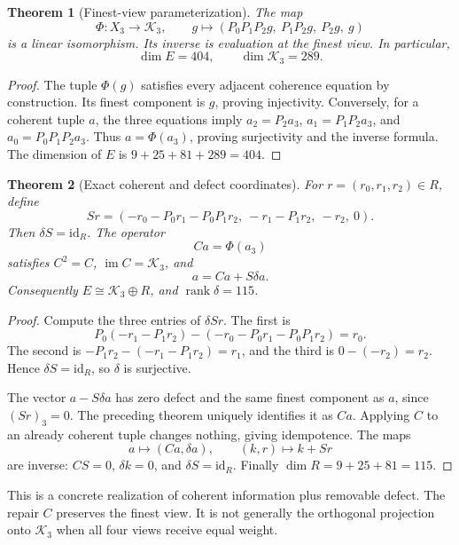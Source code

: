 \documentclass[11pt]{article}
\newtheorem{theorem}{Theorem}[section]
\theoremstyle{definition}
\theoremstyle{remark}
\newcommand{\K}{\mathcal K}
\newcommand{\id}{\mathrm{id}}
\newcommand{\im}{\operatorname{im}}
\begin{document}
\begin{theorem}[Finest-view parameterization]
The map
\[
 \Phi:X_3\longrightarrow\K_3,\qquad
 g\longmapsto(P_0P_1P_2g,\ P_1P_2g,\ P_2g,\ g)
\]
is a linear isomorphism. Its inverse is evaluation at the finest view. In particular,
\[
 \dim E=404,\qquad \dim\K_3=289.
\]
\end{theorem}
\begin{proof}
The tuple $\Phi(g)$ satisfies every adjacent coherence equation by construction. Its finest component is $g$, proving injectivity. Conversely, for a coherent tuple $a$, the three equations imply $a_2=P_2a_3$, $a_1=P_1P_2a_3$, and $a_0=P_0P_1P_2a_3$. Thus $a=\Phi(a_3)$, proving surjectivity and the inverse formula. The dimension of $E$ is $9+25+81+289=404$.
\end{proof}

\begin{theorem}[Exact coherent and defect coordinates]
For $r=(r_0,r_1,r_2)\in R$, define
\[
 Sr=(-r_0-P_0r_1-P_0P_1r_2,\ -r_1-P_1r_2,\ -r_2,\ 0).
\]
Then $\delta S=\id_R$. The operator
\[
 Ca=\Phi(a_3)
\]
satisfies $C^2=C$, $\im C=\K_3$, and
\[
 \boxed{a=Ca+S\delta a.}
\]
Consequently $E\cong\K_3\oplus R$, and $\operatorname{rank}\delta=115$.
\end{theorem}
\begin{proof}
Compute the three entries of $\delta Sr$. The first is
\[
 P_0(-r_1-P_1r_2)-(-r_0-P_0r_1-P_0P_1r_2)=r_0.
\]
The second is $-P_1r_2-(-r_1-P_1r_2)=r_1$, and the third is $0-(-r_2)=r_2$. Hence $\delta S=\id_R$, so $\delta$ is surjective.

The vector $a-S\delta a$ has zero defect and the same finest component as $a$, since $(Sr)_3=0$. The preceding theorem uniquely identifies it as $Ca$. Applying $C$ to an already coherent tuple changes nothing, giving idempotence. The maps
\[
 a\longmapsto(Ca,\delta a),\qquad (k,r)\longmapsto k+Sr
\]
are inverse: $CS=0$, $\delta k=0$, and $\delta S=\id_R$. Finally $\dim R=9+25+81=115$.
\end{proof}

This is a concrete realization of coherent information plus removable defect. The repair $C$ preserves the finest view. It is not generally the orthogonal projection onto $\K_3$ when all four views receive equal weight.
\end{document}
